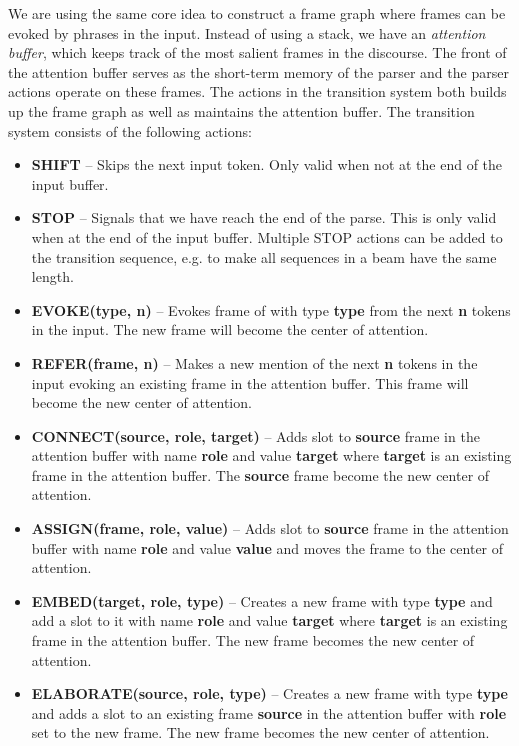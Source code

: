 \documentclass[11pt,a4paper]{article}
\begin{document}
We are using the same core idea to construct a frame graph where frames can be
evoked by phrases in the input. Instead of using a stack, we have an
\emph{attention buffer}, which keeps track of the most salient frames in the
discourse. The front of the attention buffer serves as the short-term memory of
the parser and the parser actions operate on these frames. The actions in the
transition system both builds up the frame graph as well as maintains the
attention buffer. The transition system consists of the following actions:

\begin{itemize}
  \item {\bf SHIFT} -- Skips the next input token. Only valid when not at the
        end of the input buffer.
  \item {\bf STOP} -- Signals that we have reach the end of the parse. This is
        only valid when at the end of the input buffer. Multiple STOP actions
        can be added to the transition sequence, e.g. to make all sequences in a
        beam have the same length.
  \item {\bf EVOKE(type, n)} -- Evokes frame of with type {\bf type} from
        the next {\bf n} tokens in the input. The new frame will become the
        center of attention.
  \item {\bf REFER(frame, n)} -- Makes a new mention of the next {\bf n} tokens
        in the input evoking an existing frame in the attention buffer. This
        frame will become the new center of attention.
  \item {\bf CONNECT(source, role, target)} -- Adds slot to {\bf source} frame
        in the attention buffer with name {\bf role} and value {\bf target}
        where {\bf target} is an existing frame in the attention buffer. The
        {\bf source} frame become the new center of attention.
  \item {\bf ASSIGN(frame, role, value)} -- Adds slot to {\bf source} frame in
        the attention buffer  with name {\bf role} and value {\bf value} and
        moves the frame to the center of attention.
  \item {\bf EMBED(target, role, type)} -- Creates a new frame with
        type {\bf type} and add a slot to it with name {\bf role} and value
        {\bf target} where {\bf target} is an existing frame in the attention
        buffer. The new frame becomes the new center of attention.
  \item {\bf ELABORATE(source, role, type)} -- Creates a new frame with type
        {\bf type} and adds a slot to an existing frame {\bf source} in the
        attention buffer with {\bf role} set to the new frame. The new frame
        becomes the new center of attention.
\end{itemize}
\end{document}
